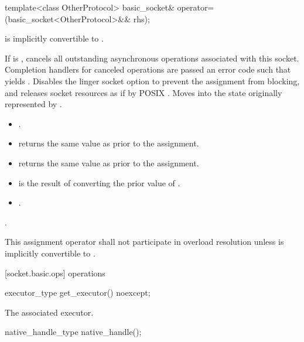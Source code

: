 \begin{itemdecl}
template<class OtherProtocol>
  basic_socket& operator=(basic_socket<OtherProtocol>&& rhs);
\end{itemdecl}

\begin{itemdescr}
\pnum
\requires {} is implicitly convertible to .

\pnum
\effects If  is , cancels all outstanding asynchronous operations associated with this socket. Completion handlers for canceled operations are passed an error code  such that  yields . Disables the linger socket option to prevent the assignment from blocking, and releases socket resources as if by POSIX . Moves into  the state originally represented by .

\pnum
\postconditions 
\begin{itemize}
\item
{}.
\item
{} returns the same value as  prior to the assignment.
\item
{} returns the same value as  prior to the assignment.
\item
{} is the result of converting the prior value of .
\item
{}.
\end{itemize}

\pnum
\returns {}.

\pnum
\remarks This assignment operator shall not participate in overload resolution unless  is implicitly convertible to .
\end{itemdescr}



[socket.basic.ops]{ operations}

\begin{itemdecl}
executor_type get_executor() noexcept;
\end{itemdecl}

\begin{itemdescr}
\pnum
\returns The associated executor.
\end{itemdescr}

\begin{itemdecl}
native_handle_type native_handle();
\end{itemdecl}

